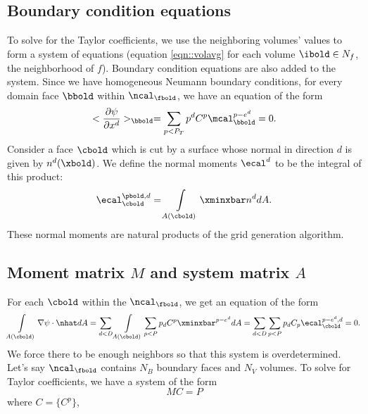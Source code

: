 \documentclass{article}
\begin{document}
{\subsection{Boundary condition equations}

To solve for the Taylor coefficients, we use the neighboring volumes'
values  to form a system of equations (equation \ref{eqn::volavg}
for each volume $\ibold \in N_f$, the neighborhood of $f$).  Boundary
condition equations are also added to the system.   Since we have
homogeneous Neumann boundary conditions, for every domain face $\bbold$
within $\ncal_\fbold$, we have an equation of the form
\begin{equation}
  <\frac{\partial \psi}{\partial x^d}>_\bbold  =
  \sum\limits_{p < P_T} p^d C^{p} \mcal^{p-e^d}_\bbold = 0.
\end{equation}
Consider a face $\cbold$ which is cut by a surface whose
normal in direction $d$ is given by $n^d(\xbold)$.  We define the
normal moments $\ecal^d$ to be the integral of this product:
\begin{equation}
\ecal^{\pbold, d}_\cbold  =  \int\limits_{A(\cbold)} \xminxbar n^d dA.
\label{eqn::normmoment}
\end{equation}
These normal moments are natural products of the \cite{Schwartz2015}
grid generation algorithm.

\subsection{Moment matrix $M$ and system matrix $A$}

For each $\cbold$ within the $\ncal_\fbold$, we get an equation of the form
\begin{equation}
  \int\limits_{A(\cbold)}  \nabla \psi \cdot \nhat dA =
  \sum\limits_{d < D} \int\limits_{A(\cbold)} \sum_{p < P} p_d C^p
  \xminxbar^{p-e^d} dA
  = 
\sum\limits_{d < D} \sum_{p < P}  p_d C_p \ecal^{p-e^d,d}_\cbold = 0.
\end{equation}
We force there to be enough neighbors so that this system is
overdetermined.  Let's say $\ncal_\fbold$ contains $N_B$ boundary faces and
$N_V$ volumes.   To solve for Taylor coefficients, we have a system 
of the form
\begin{equation*}
M C = P 
\end{equation*}
where $C=\{C^p\}$, 

}
\end{document}
